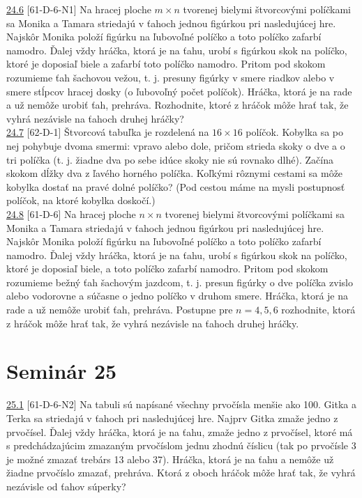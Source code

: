 \noindent \ul{24.6} [61-D-6-N1] Na hracej ploche $m\times n$ tvorenej bielymi štvorcovými políčkami sa Monika a Tamara striedajú v ťahoch jednou figúrkou pri nasledujúcej hre. Najskôr Monika položí figúrku na ľubovoľné políčko a toto políčko zafarbí namodro. Ďalej vždy hráčka, ktorá je na ťahu, urobí s figúrkou skok na políčko, ktoré je doposiaľ biele a zafarbí toto políčko namodro. Pritom pod skokom rozumieme ťah šachovou vežou, t. j. presuny figúrky v smere riadkov alebo v smere stĺpcov hracej dosky (o ľubovoľný počet políčok). Hráčka, ktorá je na rade a už nemôže urobiť ťah, prehráva. Rozhodnite, ktoré z hráčok môže hrať tak, že vyhrá nezávisle na ťahoch druhej hráčky?\\

\noindent \ul{24.7} [62-D-1]
Štvorcová tabuľka je rozdelená na $16\times16$ políčok. Kobylka sa po nej pohybuje dvoma smermi: vpravo alebo dole, pričom strieda skoky o dve a o tri políčka (t. j. žiadne dva po sebe idúce skoky nie sú rovnako dlhé). Začína skokom dĺžky dva z ľavého horného políčka. Koľkými rôznymi cestami sa môže kobylka dostať na pravé dolné políčko? (Pod cestou máme na mysli postupnosť políčok, na ktoré kobylka doskočí.)\\

\noindent \ul{24.8} [61-D-6]
Na hracej ploche $n \times n$ tvorenej bielymi štvorcovými políčkami sa Monika a Tamara striedajú v ťahoch jednou figúrkou pri nasledujúcej hre. Najskôr Monika položí figúrku na ľubovoľné políčko a toto políčko zafarbí namodro. Ďalej vždy hráčka, ktorá je na ťahu, urobí s figúrkou skok na políčko, ktoré je doposiaľ biele, a toto políčko zafarbí namodro. Pritom pod skokom rozumieme bežný ťah šachovým jazdcom, t. j. presun figúrky o dve políčka zvislo alebo vodorovne a súčasne o jedno políčko v druhom smere. Hráčka, ktorá je na rade a už nemôže urobiť ťah, prehráva. Postupne pre $n = 4, 5, 6$ rozhodnite, ktorá z hráčok môže hrať tak, že vyhrá nezávisle na ťahoch druhej hráčky.\\

\section*{Seminár 25}

\noindent \ul{25.1} [61-D-6-N2] Na tabuli sú napísané všechny prvočísla menšie ako 100. Gitka a Terka sa striedajú v ťahoch pri nasledujúcej hre. Najprv Gitka zmaže jedno z prvočísel. Ďalej vždy hráčka, ktorá je na ťahu, zmaže jedno z prvočísel, ktoré má s predchádzajúcim zmazaným prvočíslom jednu zhodnú číslicu (tak po prvočísle 3 je možné zmazať trebárs 13 alebo 37). Hráčka, ktorá je na ťahu a nemôže už žiadne prvočíslo zmazať, prehráva. Ktorá z oboch hráčok môže hrať tak, že vyhrá nezávisle od ťahov súperky?\\

